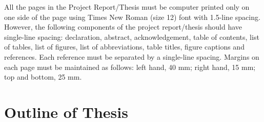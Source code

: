 All the pages in the Project Report/Thesis must be computer printed only on one side of the page using
Times New Roman (size 12) font with 1.5-line spacing.
However, the following components of the project report/thesis should have single-line spacing: declaration, abstract, acknowledgement, table of contents, list of tables, list of figures, list of abbreviations, table titles, figure captions and references. 
Each reference must be separated by a single-line spacing. Margins on each page must be maintained as
follows: left hand, 40 mm; right hand, 15 mm; top and bottom, 25 mm.


\citep{Streftaris2004} 
 
\section{Outline of Thesis}
